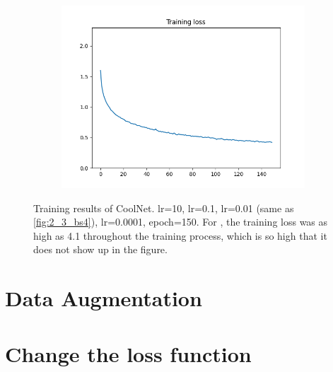 \documentclass[12pt]{article}
\begin{document}
\begin{figure}
\begin{subfigure}{0.19\textwidth}
    \includegraphics[width=\linewidth]{loss_3_e150.png}
    \caption{}
    \label{fig:3_e150}
  \end{subfigure}
  \caption{Training results of CoolNet.  lr=10,  lr=0.1,  lr=0.01 (same as \ref{fig:2_3_bs4}),  lr=0.0001,  epoch=150. For , the training loss was as high as 4.1 throughout the training process, which is so high that it does not show up in the figure.}
  \label{fig:3}
\end{figure}

\section{Data Augmentation}

\section{Change the loss function}



\end{document}

